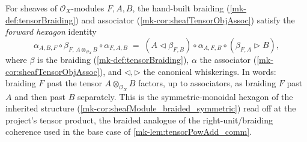 \begin{lemma}\label{mk-lem:tensorBraiding_hexagon_forward}
  \leanok

  For sheaves of \(\mathcal{O}_X\)-modules \(F, A, B\), the hand-built braiding
  (\ref{mk-def:tensorBraiding}) and associator (\ref{mk-cor:sheafTensorObjAssoc})
  satisfy the \emph{forward hexagon} identity
  \[
    \alpha_{A,B,F} \circ
    \beta_{F,\,A\otimes_{\mathcal{O}_X}B} \circ
    \alpha_{F,A,B}
    \;=\;
    (A \lhd \beta_{F,B}) \circ
    \alpha_{A,F,B} \circ
    (\beta_{F,A} \rhd B),
  \]
  where \(\beta\) is the braiding (\ref{mk-def:tensorBraiding}), \(\alpha\) the
  associator (\ref{mk-cor:sheafTensorObjAssoc}), and \(\lhd,\rhd\) the canonical
  whiskerings. In words: braiding \(F\) past the tensor \(A\otimes_{\mathcal{O}_X}
  B\) factors, up to associators, as braiding \(F\) past \(A\) and then past
  \(B\) separately. This is the symmetric-monoidal hexagon of the inherited
  structure (\ref{mk-cor:sheafModule_braided_symmetric}) read off at the project's
  tensor product, the braided analogue of the right-unit/braiding coherence used
  in the base case of \ref{mk-lem:tensorPowAdd_comm}.
\end{lemma}

